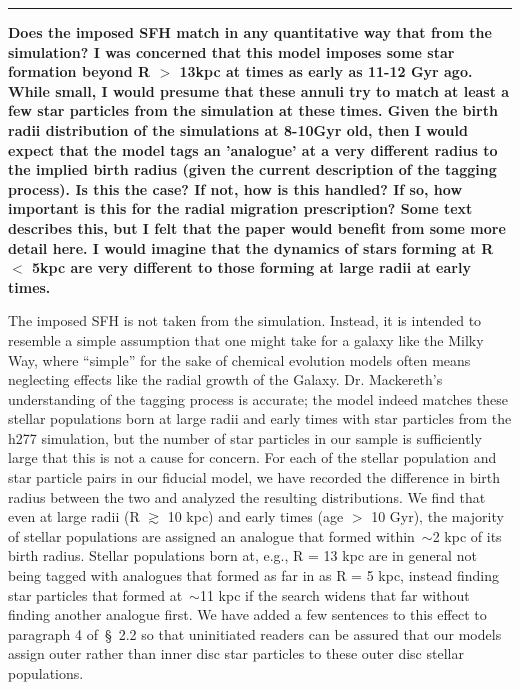 \documentclass{report}
\newcommand{\breakline}{\noindent\rule{\textwidth}{1pt}}
\begin{document}
\par\null\par 
\breakline 
\par\null\par 
\textbf{
	Does the imposed SFH match in any quantitative way that from the 
	simulation? 
	I was concerned that this model imposes some star formation beyond R $>$ 
	13kpc at times as early as 11-12 Gyr ago. 
	While small, I would presume that these annuli try to match at least a few 
	star particles from the simulation at these times. 
	Given the birth radii distribution of the simulations at 8-10Gyr old, then 
	I would expect that the model tags an 'analogue' at a very different radius 
	to the implied birth radius (given the current description of the tagging 
	process). 
	Is this the case? 
	If not, how is this handled? 
	If so, how important is this for the radial migration prescription? 
	Some text describes this, but I felt that the paper would benefit from some 
	more detail here. 
	I would imagine that the dynamics of stars forming at R $<$ 5kpc are very 
	different to those forming at large radii at early times. 
} 
\par 
The imposed SFH is not taken from the simulation. 
Instead, it is intended to resemble a simple assumption that one might take for 
a galaxy like the Milky Way, where ``simple'' for the sake of chemical 
evolution models often means neglecting effects like the radial growth of the 
Galaxy. 
Dr. Mackereth's understanding of the tagging process is accurate; the model 
indeed matches these stellar populations born at large radii and early times 
with star particles from the h277 simulation, but the number of star particles 
in our sample is sufficiently large that this is not a cause for concern. 
For each of the stellar population and star particle pairs in our fiducial 
model, we have recorded the difference in birth radius between the two and 
analyzed the resulting distributions. 
We find that even at large radii (R $\gtrsim$ 10 kpc) and early times (age $>$ 
10 Gyr), the majority of stellar populations are assigned an analogue that 
formed within~$\sim$2 kpc of its birth radius. 
Stellar populations born at, e.g., R = 13 kpc are in general not being tagged 
with analogues that formed as far in as R = 5 kpc, instead finding star 
particles that formed at~$\sim$11 kpc if the search widens that far without 
finding another analogue first. 
We have added a few sentences to this effect to paragraph 4 of~\S~2.2 so 
that uninitiated readers can be assured that our models assign outer rather 
than inner disc star particles to these outer disc stellar populations. 
\end{document}
